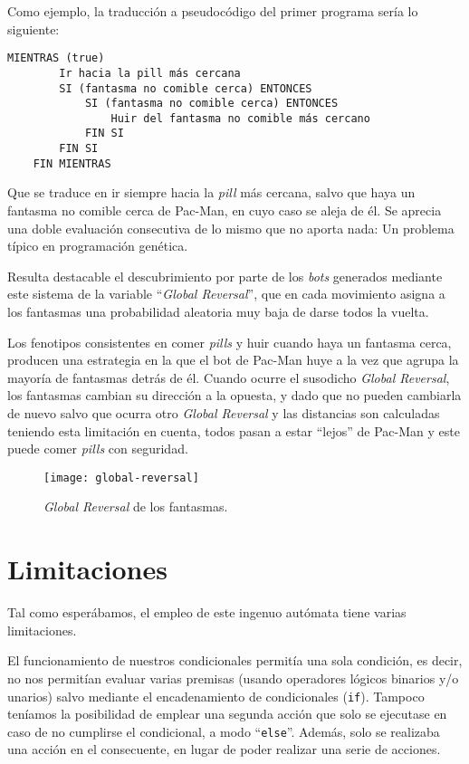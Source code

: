 Como ejemplo, la traducción a pseudocódigo del primer programa sería lo siguiente:
\begin{lstlisting}[caption=Pseudocódigo correspondiente al programa \texttt{E?P?PH}]
    MIENTRAS (true)
        Ir hacia la pill más cercana
        SI (fantasma no comible cerca) ENTONCES
            SI (fantasma no comible cerca) ENTONCES
                Huir del fantasma no comible más cercano
            FIN SI
        FIN SI
    FIN MIENTRAS
\end{lstlisting}

Que se traduce en ir siempre hacia la \textit{pill} más cercana, salvo que haya un fantasma no comible cerca de Pac-Man, en cuyo caso se aleja de él. Se aprecia una doble evaluación consecutiva de lo mismo que no aporta nada: Un problema típico en programación genética. 

\blankline

Resulta destacable el descubrimiento por parte de los \textit{bots} generados mediante este sistema de la variable ``\textit{Global Reversal}'', que en cada movimiento asigna a los fantasmas una probabilidad aleatoria muy baja de darse todos la vuelta.
 
Los fenotipos consistentes en comer \textit{pills} y huir cuando haya un fantasma cerca, producen una estrategia en la que el bot de Pac-Man huye a la vez que agrupa la mayoría de fantasmas detrás de él. Cuando ocurre el susodicho \textit{Global Reversal}, los fantasmas cambian su dirección a la opuesta, y dado que no pueden cambiarla de nuevo salvo que ocurra otro \textit{Global Reversal} y las distancias son calculadas teniendo esta limitación en cuenta, todos pasan a estar ``lejos'' de Pac-Man y este puede comer \textit{pills} con seguridad.
\begin{figure}[H]
\centering
\texttt{[image: global-reversal]}
\caption{\textit{Global Reversal} de los fantasmas.}
\end{figure}

\section{Limitaciones}
Tal como esperábamos, el empleo de este ingenuo autómata tiene varias limitaciones.
 
El funcionamiento de nuestros condicionales permitía una sola condición, es decir, no nos permitían evaluar varias premisas (usando operadores lógicos binarios y/o unarios) salvo mediante el encadenamiento de condicionales (\texttt{if}). 
Tampoco teníamos la posibilidad de emplear una segunda acción que solo se ejecutase en caso de no cumplirse el condicional, a modo ``\texttt{else}''. Además, solo se realizaba una acción en el consecuente, en lugar de poder realizar una serie de acciones. 
 

